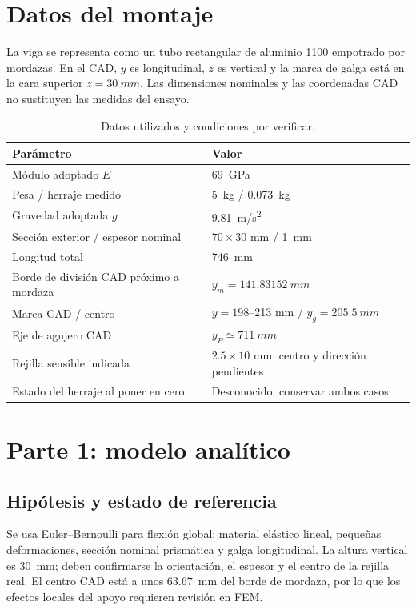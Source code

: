\documentclass[11pt,a4paper]{article}
\begin{document}
\section{Datos del montaje}
La viga se representa como un tubo rectangular de aluminio 1100 empotrado por mordazas. En el CAD, $y$ es longitudinal, $z$ es vertical y la marca de galga está en la cara superior $z=\SI{30}{mm}$. Las dimensiones nominales y las coordenadas CAD no sustituyen las medidas del ensayo.
\begin{table}[H]\centering\small
\caption{Datos utilizados y condiciones por verificar.}
\begin{tabular}{@{}p{}p{}@{}}\toprule
Parámetro & Valor \\\midrule
Módulo adoptado $E$ & \SI{69}{GPa} \\
Pesa / herraje medido & \SI{5}{kg} / \SI{0.073}{kg} \\
Gravedad adoptada $g$ & \SI{9.81}{m/s^2} \\
Sección exterior / espesor nominal & $70\times30$ mm / \SI{1}{mm} \\
Longitud total & \SI{746}{mm} \\
Borde de división CAD próximo a mordaza & $y_m=\SI{141.83152}{mm}$ \\
Marca CAD / centro & $y=198$--213 mm / $y_g=\SI{205.5}{mm}$ \\
Eje de agujero CAD & $y_P\simeq\SI{711}{mm}$ \\
Rejilla sensible indicada & $2.5\times10$ mm; centro y dirección pendientes \\
Estado del herraje al poner en cero & Desconocido; conservar ambos casos \\
\bottomrule\end{tabular}\end{table}

\section{Parte 1: modelo analítico}
\subsection{Hipótesis y estado de referencia}
Se usa Euler--Bernoulli para flexión global: material elástico lineal, pequeñas deformaciones, sección nominal prismática y galga longitudinal. La altura vertical es \SI{30}{mm}; deben confirmarse la orientación, el espesor y el centro de la rejilla real. El centro CAD está a unos \SI{63.67}{mm} del borde de mordaza, por lo que los efectos locales del apoyo requieren revisión en FEM.
\end{document}
